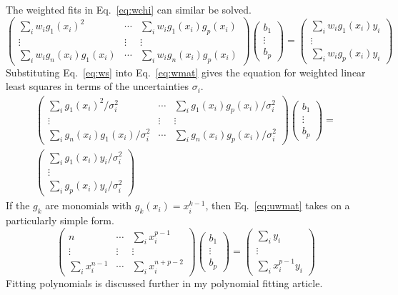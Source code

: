 \documentclass{scrartcl}
\begin{document}
The weighted fits in Eq.~\ref{eq:wchi} can similar be solved.
\begin{equation}
\left(\begin{array}{ccc}
\sum_i w_i g_1(x_i)^2&\cdots&\sum_i w_i g_1(x_i)g_p(x_i)\\
\vdots&\vdots&\vdots\\
\sum_i w_i g_n(x_i)g_1(x_i)&\cdots&\sum_i w_i g_n(x_i)g_p(x_i)
\end{array}\right)
\left(\begin{array}{c}
b_1\\
\vdots\\
b_p
\end{array}\right) =
\left(\begin{array}{c}
\sum_i w_i g_1(x_i)y_i\\
\vdots\\
\sum_i w_i g_p(x_i)y_i
\end{array}\right)\label{eq:wmat}
\end{equation}
Substituting Eq.~\ref{eq:ws} into Eq.~\ref{eq:wmat}
gives the equation for weighted linear least squares
in terms of the uncertainties $\sigma_i$.
\begin{multline}
\left(\begin{array}{ccc}
\sum_i g_1(x_i)^2/\sigma_i^2&\cdots&\sum_i g_1(x_i)g_p(x_i)/\sigma_i^2\\
\vdots&\vdots&\vdots\\
\sum_i g_n(x_i)g_1(x_i)/\sigma_i^2&\cdots&\sum_i g_n(x_i)g_p(x_i)/\sigma_i^2
\end{array}\right)
\left(\begin{array}{c}
b_1\\
\vdots\\
b_p
\end{array}\right) =\\
\left(\begin{array}{c}
\sum_i g_1(x_i)y_i/\sigma_i^2\\
\vdots\\
\sum_i g_p(x_i)y_i/\sigma_i^2
\end{array}\right)\label{eq:smat}
\end{multline}
If the $g_k$ are monomials with $g_k(x_i)=x_i^{k-1}$, then
Eq.~\ref{eq:uwmat} takes on a particularly simple form.
\begin{equation}
\left(\begin{array}{ccc}
n&\cdots&\sum_i x_i^{p-1}\\
\vdots&\vdots&\vdots\\
\sum_i x_i^{n-1}&\cdots&\sum_i x_i^{n+p-2}
\end{array}\right)
\left(\begin{array}{c}
b_1\\
\vdots\\
b_p
\end{array}\right) =
\left(\begin{array}{c}
\sum_i y_i\\
\vdots\\
\sum_i x_i^{p-1}y_i
\end{array}\right)
\end{equation}
Fitting polynomials is discussed further in my polynomial fitting
article\cite{polyfit}.
\end{document}
